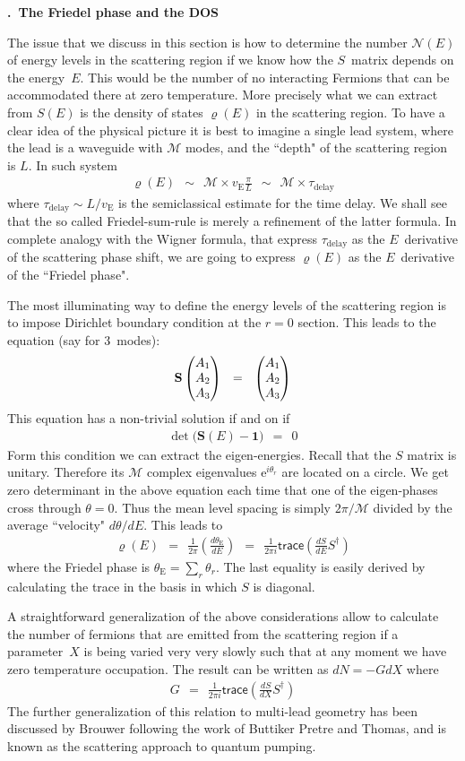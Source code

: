 \documentclass[onecolumn,fleqn, 11pt]{revtex4}
\newcommand{\trc}{\mathsf{trace}}
\newcommand{\eexp}{\mathrm{e}^}
\newcommand{\gdos}{\varrho} \newcommand{\EPS}{\mathcal{E}}
\newcommand{\tbox}[1]{\text{#1}}
\newcommand{\amatrix}[1]{\begin{matrix} #1 \end{matrix}}
\newcommand{\beq}{\begin{eqnarray}}
\newcommand{\eeq}{\end{eqnarray}}
\renewcommand{\thesubsection}{\arabic{subsection}}
\renewcommand{\thesubsubsection}{\arabic{subsubsection}}
\newcommand{\sheadC}[1]
{
\addtocounter{subsubsection}{1}
\vspace{5mm}
{\bf \thesubsection.\thesubsubsection \ #1}  
\nopagebreak
\phantomsection
}
\begin{document}
\sheadC{The Friedel phase and the DOS} 


The issue that we discuss in this section is how 
to determine the number $\mathcal{N}(E)$  
of energy levels in the scattering region if we know 
how the $S$~matrix depends on the energy~$E$.
This would be the number of no interacting Fermions 
that can be accommodated there at zero temperature.
More precisely what we can extract from $S(E)$ 
is the density of states $\gdos(E)$ in the scattering region. 
To have a clear idea of the physical picture it is best 
to imagine a single lead system, 
where the lead is a waveguide with $\mathcal{M}$ modes, 
and the ``depth" of the scattering region is $L$.
In such system 
\beq 
\gdos(E) 
\ \ \sim \ \ 
\mathcal{M} \times v_{\tbox{E}} \frac{\pi}{L}
\ \ \sim \ \
\mathcal{M}  \times \tau_{\tbox{delay}}
\eeq
where $\tau_{\tbox{delay}} \sim L/v_{\tbox{E}}$ 
is the semiclassical estimate for the time delay.  
We shall see that the so called Friedel-sum-rule 
is merely a refinement of the latter formula.
In complete analogy with the Wigner formula,  
that express $\tau_{\tbox{delay}}$ as 
the $E$~derivative of the scattering phase shift, 
we are going to express $\gdos(E)$ as 
the $E$~derivative of the ``Friedel phase". 

 

The most illuminating way to define the energy levels 
of the scattering region is to impose Dirichlet boundary 
condition at the $r=0$ section. This leads to 
the equation (say for 3~modes):
\beq 
\mathbf{S} 
\left(\amatrix{A_1\cr A_2\cr A_3}\right)
\ \ = \ \ 
\left(\amatrix{A_1\cr A_2\cr A_3}\right)
\eeq
This equation has a non-trivial solution if and on if 
\beq 
\det\Big( \mathbf{S}(E) - \bm{1} \Big) \ \ = \ \ 0
\eeq
Form this condition we can extract the eigen-energies. 
Recall that the $S$ matrix is unitary.  
Therefore its $\mathcal{M}$ complex eigenvalues ${\eexp{i\theta_r}}$ 
are located on a circle. We get zero determinant 
in the above equation each time that one of the 
eigen-phases cross through ${\theta=0}$. 
Thus the mean level spacing is simply $2\pi/\mathcal{M}$ 
divided by the average ``velocity" $d\theta/dE$.  
This leads to 
\beq 
\gdos(E)
\ \ = \ \ 
\frac{1}{2\pi} \left(\frac{d\theta_{\tbox{E}}}{dE}\right)
\ \ = \ \ 
\frac{1}{2\pi i}\trc\left(\frac{dS}{dE}S^{\dagger}\right)
\eeq 
where the Friedel phase is ${\theta_{\tbox{E}}=\sum_r \theta_r}$.
The last equality is easily derived by calculating the 
trace in the basis in which $S$ is diagonal.


A straightforward generalization of the above considerations 
allow to calculate the number of fermions that are emitted 
from the scattering region if a parameter~$X$ is being varied 
very very slowly such that at any moment we have zero temperature 
occupation. The result can be written as ${dN=-GdX}$ where 
\beq 
G
\ \ = \ \ 
\frac{1}{2\pi i}\trc\left(\frac{dS}{dX}S^{\dagger}\right)
\eeq 
The further generalization of this relation to multi-lead geometry 
has been discussed by Brouwer following the work of Buttiker Pretre and Thomas, 
and is known as the scattering approach to quantum pumping. 
  
\end{document}
